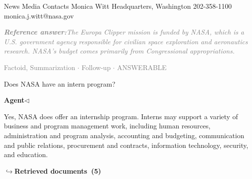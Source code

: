 \documentclass[a4paper,11pt]{article}
\begin{document}
\begin{docenv}
{News Media Contacts
Monica Witt
Headquarters, Washington
202-358-1100
monica.j.witt@nasa.gov}
\end{docenv}
\begin{refanswerenv}
{\footnotesize\textit{\textcolor{gray}{\textbf{Reference answer:}\enspace The Europa Clipper mission is funded by NASA, which is a U.S. government agency responsible for civilian space exploration and aeronautics research. NASA's budget comes primarily from Congressional appropriations.}}}
\end{refanswerenv}
\vspace{0.5em}
\hfill{\tiny\textcolor{gray}{Factoid, Summarization $\cdot$ Follow-up $\cdot$ ANSWERABLE}}
\begin{userbubble}
Does NASA have an intern program?
\end{userbubble}
\noindent\hfill{\small\textcolor{agentcolor}{\textbf{Agent\enspace$\triangleleft$}}}
\begin{agentbubble}
Yes, NASA does offer an internship program. Interns may support a variety of business and program management work, including human resources, administration and program analysis, accounting and budgeting, communication and public relations, procurement and contracts, information technology, security, and education.
\end{agentbubble}
\noindent\hfill{\footnotesize\textcolor{doccolor}{\textbf{$\hookrightarrow$\enspace Retrieved documents~(5)}}}
\end{document}
